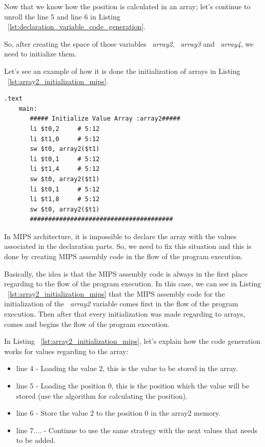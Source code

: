 \documentclass[
  oneside,
  11pt, a4paper,
  footinclude=true,
  headinclude=true,
  cleardoublepage=empty
]{scrbook}
\begin{document}
Now that we know how the position is calculated in an array; let's continue to unroll the line 5 and line 6 in Listing ~\ref{lst:declaration_variable_code_generation}.

So, after creating the space of those variables ~\textit{array2}, ~\textit{array3} and ~\textit{array4}, we need to initialize them.

Let's see an example of how it is done the initialization of arrays in Listing ~\ref{lst:array2_initialization_mips}.

\begin{lstlisting}[caption={MIPS assembly code generated for the variable array2},label={lst:array2_initialization_mips}]
  .text
    main:
       ##### Initialize Value Array :array2#####
       li $t0,2		# 5:12
       li $t1,0		# 5:12
       sw $t0, array2($t1)		
       li $t0,1		# 5:12
       li $t1,4		# 5:12
       sw $t0, array2($t1)		
       li $t0,1		# 5:12
       li $t1,8		# 5:12
       sw $t0, array2($t1)		
       #######################################
\end{lstlisting}

In MIPS architecture, it is impossible to declare the array with the values associated in the declaration parts. So, we need to fix this situation and this is done by creating MIPS assembly code in the flow of the program execution.

Basically, the idea is that the MIPS assembly code is always in the first place regarding to the flow of the program execution. In this case, we can see in Listing ~\ref{lst:array2_initialization_mips} that the MIPS assembly code for the initialization of the ~\textit{array2} variable comes first in the flow of the program execution. Then after that every initialization was made regarding to arrays, comes and begins the flow of the program execution.

In Listing ~\ref{lst:array2_initialization_mips}, let's explain how the code generation works for values regarding to the array:

\begin{itemize}
\item line 4 - Loading the value 2, this is the value to be stored in the array.
\item line 5 - Loading the position 0, this is the position which the value will be stored (use the algorithm for calculating the position).
\item line 6 - Store the value 2 to the position 0 in the array2 memory.
\item line 7.... - Continue to use the same strategy with the next values that needs to be added.
\end{itemize}
\end{document}
